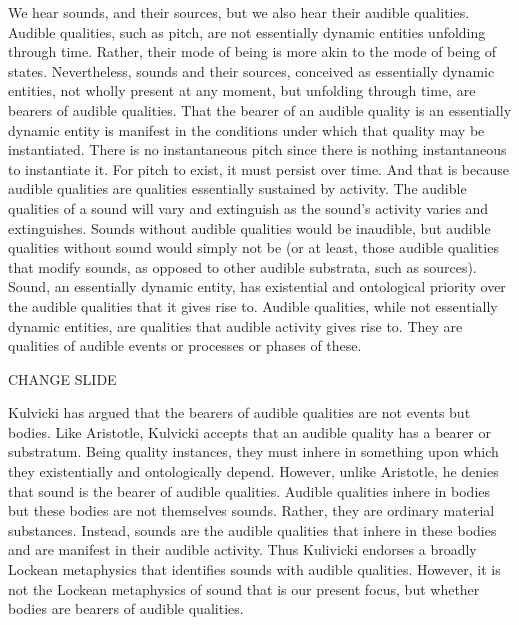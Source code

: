 \documentclass[12pt]{article}
\begin{document}
We hear sounds, and their sources, but we also hear their audible qualities. Audible qualities, such as pitch, are not essentially dynamic entities unfolding through time. Rather, their mode of being is more akin to the mode of being of states. Nevertheless, sounds and their sources, conceived as essentially dynamic entities, not wholly present at any moment, but unfolding through time, are bearers of audible qualities. That the bearer of an audible quality is an essentially dynamic entity is manifest in the conditions under which that quality may be instantiated. There is no instantaneous pitch since there is nothing instantaneous to instantiate it. For pitch to exist, it must persist over time. And that is because audible qualities are qualities essentially sustained by activity. The audible qualities of a sound will vary and extinguish as the sound’s activity varies and extinguishes. Sounds without audible qualities would be inaudible, but audible qualities without sound would simply not be (or at least, those audible qualities that modify sounds, as opposed to other audible substrata, such as sources). Sound, an essentially dynamic entity, has existential and ontological priority over the audible qualities that it gives rise to. Audible qualities, while not essentially dynamic entities, are qualities that audible activity gives rise to. They are qualities of audible events or processes or phases of these.


CHANGE SLIDE

Kulvicki has argued that the bearers of audible qualities are not events but bodies. Like Aristotle, Kulvicki accepts that an audible quality has a bearer or substratum. Being quality instances, they must inhere in something upon which they existentially and ontologically depend. However, unlike Aristotle, he denies that sound is the bearer of audible qualities. Audible qualities inhere in bodies but these bodies are not themselves sounds. Rather, they are ordinary material substances. Instead, sounds are the audible qualities that inhere in these bodies and are manifest in their audible activity. Thus Kulivicki endorses a broadly Lockean metaphysics that identifies sounds with audible qualities. However, it is not the Lockean metaphysics of sound that is our present focus, but whether bodies are bearers of audible qualities.
\end{document}
